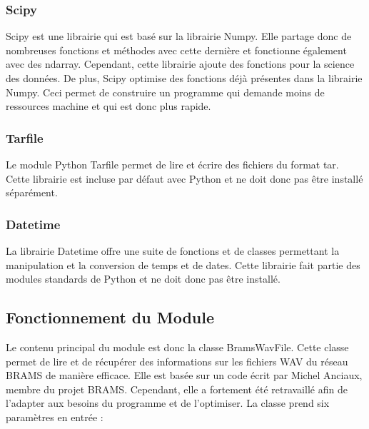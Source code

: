\documentclass[11pt]{article}
\begin{document}
\subsubsection{Scipy} \label{SCIPY}

Scipy est une librairie qui est basé sur la librairie Numpy.
Elle partage donc de nombreuses fonctions et méthodes avec cette dernière et fonctionne également avec des ndarray.
Cependant, cette librairie ajoute des fonctions pour la science des données.
De plus, Scipy optimise des fonctions déjà présentes dans la librairie Numpy.
Ceci permet de construire un programme qui demande moins de ressources machine et qui est donc plus rapide.

\subsubsection{Tarfile}

Le module Python Tarfile permet de lire et écrire des fichiers du format tar.
Cette librairie est incluse par défaut avec Python et ne doit donc pas être installé séparément.

\subsubsection{Datetime} \label{DATETIME1}

La librairie Datetime offre une suite de fonctions et de classes permettant la manipulation et la conversion de temps et de dates.
Cette librairie fait partie des modules standards de Python et ne doit donc pas être installé.

\subsection{Fonctionnement du Module}

Le contenu principal du module est donc la classe BramsWavFile.
Cette classe permet de lire et de récupérer des informations sur les fichiers WAV du réseau BRAMS de manière efficace.
Elle est basée sur un code écrit par Michel Anciaux, membre du projet BRAMS.
Cependant, elle a fortement été retravaillé afin de l'adapter aux besoins du programme et de l'optimiser.
La classe prend six paramètres en entrée :
\end{document}
